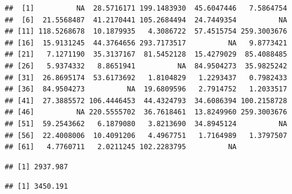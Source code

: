\documentclass[11pt]{article}
\newenvironment{Shaded}{\begin{snugshade}}{\end{snugshade}}
\newcommand{\KeywordTok}[1]{\textcolor[rgb]{0.13,0.29,0.53}{\textbf{{#1}}}}
\newcommand{\DataTypeTok}[1]{\textcolor[rgb]{0.13,0.29,0.53}{{#1}}}
\newcommand{\DecValTok}[1]{\textcolor[rgb]{0.00,0.00,0.81}{{#1}}}
\newcommand{\StringTok}[1]{\textcolor[rgb]{0.31,0.60,0.02}{{#1}}}
\newcommand{\CommentTok}[1]{\textcolor[rgb]{0.56,0.35,0.01}{\textit{{#1}}}}
\newcommand{\OtherTok}[1]{\textcolor[rgb]{0.56,0.35,0.01}{{#1}}}
\newcommand{\NormalTok}[1]{{#1}}
\begin{document}
\begin{verbatim}
##  [1]          NA  28.5716171 199.1483930  45.6047446   7.5864754
##  [6]  21.5568487  41.2170441 105.2684494  24.7449354          NA
## [11] 118.5268678  10.1879935   4.3086722  57.4515754 259.3003676
## [16]  15.9131245  44.3764656 293.7173517          NA   9.8773421
## [21]   7.1271190  35.3137167  81.5452128  15.4279029  85.4088485
## [26]   5.9374332   8.8651941          NA  84.9504273  35.9825242
## [31]  26.8695174  53.6173692   1.8104829   1.2293437   0.7982433
## [36]  84.9504273          NA  19.6809596   2.7914752   1.2033517
## [41]  27.3885572 106.4446453  44.4324793  34.6086394 100.2158728
## [46]          NA 220.5555702  36.7618461  13.8249960 259.3003676
## [51]  59.2543662   6.1879080   3.8213690  34.8945124          NA
## [56]  22.4008006  10.4091206   4.4967751   1.7164989   1.3797507
## [61]   4.7760711   2.0211245 102.2283795          NA
\end{verbatim}

\begin{Shaded}
\end{Shaded}

\begin{verbatim}
## [1] 2937.987
\end{verbatim}

\begin{Shaded}
\end{Shaded}

\begin{verbatim}
## [1] 3450.191
\end{verbatim}

\begin{Shaded}
\end{Shaded}
\end{document}
